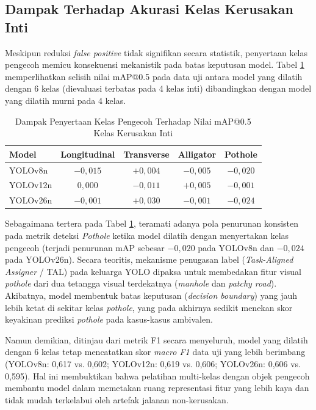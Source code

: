 \subsection{Dampak Terhadap Akurasi Kelas Kerusakan Inti}
Meskipun reduksi \textit{false positive} tidak signifikan secara statistik, penyertaan kelas pengecoh memicu konsekuensi mekanistik pada batas keputusan model. Tabel \ref{tab:selisih_map_4cls} memperlihatkan selisih nilai mAP@0.5 pada data uji antara model yang dilatih dengan 6 kelas (dievaluasi terbatas pada 4 kelas inti) dibandingkan dengan model yang dilatih murni pada 4 kelas.

\begin{table}[H]
	\centering
	\small
	\caption{Dampak Penyertaan Kelas Pengecoh Terhadap Nilai mAP@0.5 Kelas Kerusakan Inti}
	\label{tab:selisih_map_4cls}
	\begin{tabular}{|l|c|c|c|c|}
		\hline
		\textbf{Model} & \textbf{Longitudinal} & \textbf{Transverse} & \textbf{Alligator} & \textbf{Pothole} \\
		\hline
		YOLOv8n & $-0,015$ & $+0,004$ & $-0,005$ & \textbf{$-0,020$} \\
		YOLOv12n & $0,000$ & $-0,011$ & $+0,005$ & \textbf{$-0,001$} \\
		YOLOv26n & $-0,001$ & $+0,030$ & $-0,001$ & \textbf{$-0,024$} \\
		\hline
	\end{tabular}
\end{table}

Sebagaimana tertera pada Tabel \ref{tab:selisih_map_4cls}, teramati adanya pola penurunan konsisten pada metrik deteksi \textit{Pothole} ketika model dilatih dengan menyertakan kelas pengecoh (terjadi penurunan mAP sebesar $-0,020$ pada YOLOv8n dan $-0,024$ pada YOLOv26n). Secara teoritis, mekanisme penugasan label (\textit{Task-Aligned Assigner} / TAL) pada keluarga YOLO dipaksa untuk membedakan fitur visual \textit{pothole} dari dua tetangga visual terdekatnya (\textit{manhole} dan \textit{patchy road}). Akibatnya, model membentuk batas keputusan (\textit{decision boundary}) yang jauh lebih ketat di sekitar kelas \textit{pothole}, yang pada akhirnya sedikit menekan skor keyakinan prediksi \textit{pothole} pada kasus-kasus ambivalen.

Namun demikian, ditinjau dari metrik F1 secara menyeluruh, model yang dilatih dengan 6 kelas tetap mencatatkan skor \textit{macro F1} data uji yang lebih berimbang (YOLOv8n: 0,617 vs. 0,602; YOLOv12n: 0,619 vs. 0,606; YOLOv26n: 0,606 vs. 0,595). Hal ini membuktikan bahwa pelatihan multi-kelas dengan objek pengecoh membantu model dalam memetakan ruang representasi fitur yang lebih kaya dan tidak mudah terkelabui oleh artefak jalanan non-kerusakan.

